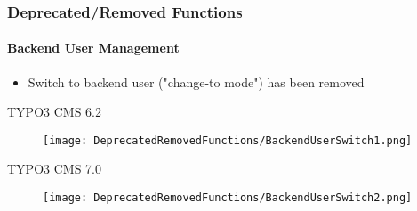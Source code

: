 
\begin{frame}[fragile]
	\frametitle{Deprecated/Removed Functions}
	\framesubtitle{Backend User Management}

	\begin{itemize}
		\item Switch to backend user ("change-to mode") has been removed
	\end{itemize}

	\smaller\tabto{1cm}\begingroup\color{typo3red}TYPO3 CMS 6.2\endgroup\normalsize
	\begin{figure}\vspace{-0.4cm}
		\texttt{[image: DeprecatedRemovedFunctions/BackendUserSwitch1.png]}
	\end{figure}

	\smaller\tabto{1cm}\begingroup\color{typo3red}TYPO3 CMS 7.0\endgroup\normalsize
	\begin{figure}\vspace{-0.4cm}
		\texttt{[image: DeprecatedRemovedFunctions/BackendUserSwitch2.png]}
	\end{figure}

\end{frame}


